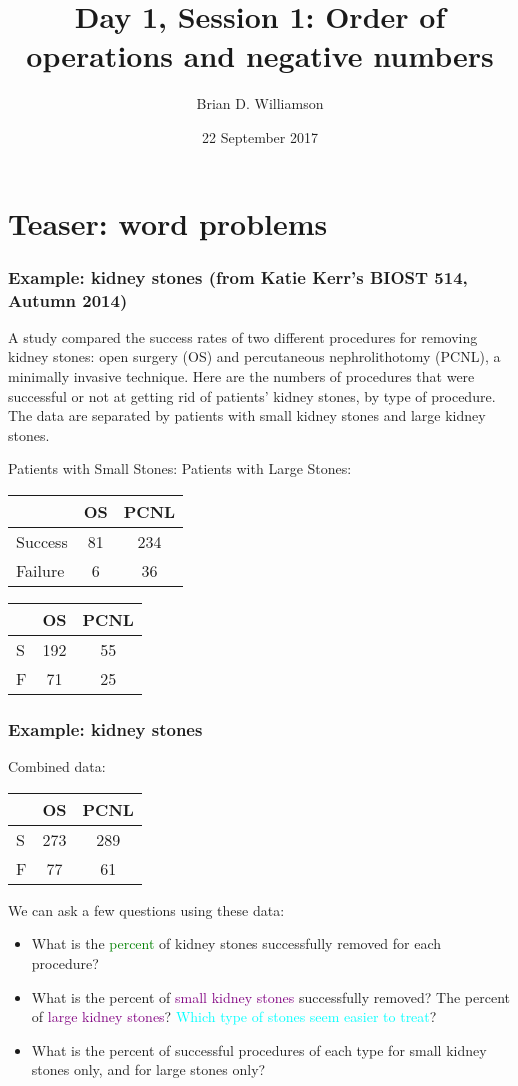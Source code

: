 \documentclass[11pt]{beamer}
\title{Day 1, Session 1: Order of operations and negative numbers}
\author{Brian D. Williamson}
\institute{EPI/BIOST Bootcamp 2017}
\date{22 September 2017}
\newcommand{\myframe}[1]{\begin{frame} \frametitle{#1}}
\newenvironment{spaceitemize}
{ \begin{itemize}
    \setlength{\itemsep}{10pt}
    \setlength{\parskip}{0pt}
    \setlength{\parsep}{0pt}     }
{ \end{itemize}                  }
\begin{document}
\begin{frame}
\titlepage
\end{frame}

\section{Teaser: word problems}
\myframe{Example: kidney stones \small(from Katie Kerr's BIOST 514, Autumn 2014)}
A study compared the success rates of two different procedures for removing kidney stones:  open surgery (OS) and percutaneous nephrolithotomy (PCNL), a minimally invasive technique.  Here are the numbers of procedures that were successful or not at getting rid of patients’ kidney stones, by type of procedure.  The data are separated by patients with small kidney stones and large kidney stones.

{\scriptsize
\centering
Patients with Small Stones: \hspace{0.5cm} Patients with Large Stones: 

\hspace{1.3cm}
\begin{tabular}{lcc}
 & OS & PCNL \\
 \hline
 Success & 81 & 234 \\
 Failure & 6 & 36 \\
 \hline
\end{tabular}
\hspace{1cm}
\begin{tabular}{lcc}
 & OS & PCNL \\
 \hline
 S & 192 & 55 \\
 F & 71 & 25 \\
 \hline
\end{tabular}
}

\end{frame}

\myframe{Example: kidney stones}
Combined data:
\begin{tabular}{lcc}
 & OS & PCNL \\
 \hline
 S & 273 & 289 \\
 F & 77 & 61 \\
 \hline
\end{tabular}

We can ask a few questions using these data:
\begin{spaceitemize}
\item What is the \textcolor{green}{percent} of kidney stones successfully removed for each procedure?
\item What is the percent of \textcolor{purple}{small kidney stones} successfully removed? The percent of \textcolor{purple}{large kidney stones}? \textcolor{cyan}{Which type of stones seem easier to treat}?
\item What is the percent of successful procedures of each type for small kidney stones only, and for large stones only?
\end{spaceitemize}
\end{frame}
\end{document}
